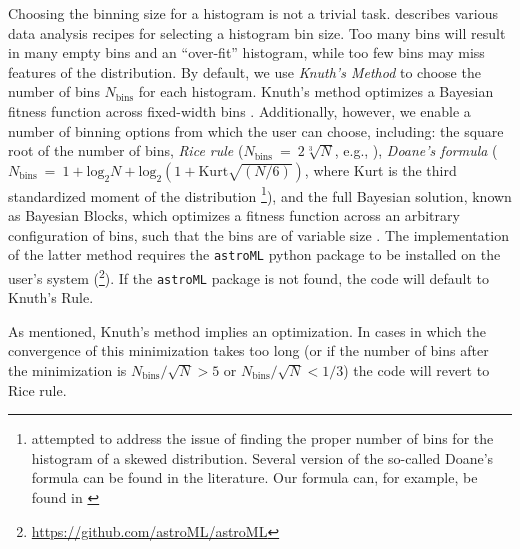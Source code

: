 \documentclass{emulateapj}
\begin{document}
Choosing the binning size for a histogram is not a trivial task.  \citet{hogg08} describes various data analysis recipes for selecting a histogram bin size. Too many bins will result in many empty bins and an ``over-fit'' histogram, while too few bins may miss features of the distribution. 
By default, we use \emph{Knuth's Method} to choose the number of bins $N_\mathrm{bins}$ for each histogram. Knuth's method  optimizes  a Bayesian fitness function across fixed-width bins \citep{Knuth06}. Additionally, however, we enable a number of binning options from which the user can choose, including: 
the square root of the number of bins, \emph{Rice rule} ($N_\mathrm{bins}~=~2\sqrt[3]{N}$, e.g., \citealt{hastie09}), 
\emph{Doane's formula} ($N_\mathrm{bins}~=~1 + \mathrm{log}_2{N} + \mathrm{log}_2\left(1 + \mathrm{Kurt}\sqrt{(N / 6)}\right)$, where Kurt is the third standardized moment of the distribution \citealt{Doane76}\footnote{\citet{Doane76} attempted to address the issue of finding the proper number of bins for the histogram of a skewed distribution. Several version of the so-called Doane's formula can be found in the literature. Our formula can, for example, be found in \citealt{Pharmacokinetic}}), and the full Bayesian solution, known as Bayesian Blocks, which optimizes a fitness function across an arbitrary configuration of bins, such that the bins are of variable size \citep{scargle13}. The implementation of the latter method requires the \verb=astroML= python package to be installed on the user's system (\citealt{astroml}\footnote{\url{https://github.com/astroML/astroML}}). If the \verb=astroML= package is not found, the code will default to Knuth's Rule. 

As mentioned, Knuth's method implies an optimization. In cases in which the convergence of this minimization takes too long (or if the number of bins after the minimization is  $N_\mathrm{bins}/\sqrt{N} > 5$ or $N_\mathrm{bins}/\sqrt{N} < 1/3$) the code will revert to Rice rule.
\end{document}
